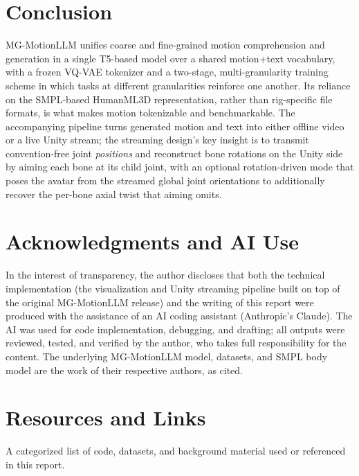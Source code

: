 \documentclass[10pt,twocolumn]{article}
\begin{document}
\section{Conclusion}
MG-MotionLLM unifies coarse and fine-grained motion comprehension and generation in a single
T5-based model over a shared motion+text vocabulary, with a frozen VQ-VAE tokenizer and a
two-stage, multi-granularity training scheme in which tasks at different granularities reinforce
one another. Its reliance on the SMPL-based HumanML3D representation, rather than rig-specific
file formats, is what makes motion tokenizable and benchmarkable. The accompanying pipeline turns
generated motion and text into either offline video or a live Unity stream; the streaming design's
key insight is to transmit convention-free joint \emph{positions} and reconstruct bone rotations on
the Unity side by aiming each bone at its child joint, with an optional rotation-driven mode that
poses the avatar from the streamed global joint orientations to additionally recover the per-bone
axial twist that aiming omits.

\section*{Acknowledgments and AI Use}
In the interest of transparency, the author discloses that both the technical implementation (the
visualization and Unity streaming pipeline built on top of the original MG-MotionLLM release) and
the writing of this report were produced with the assistance of an AI coding assistant
(Anthropic's Claude). The AI was used for code implementation, debugging, and drafting; all
outputs were reviewed, tested, and verified by the author, who takes full responsibility for the
content. The underlying MG-MotionLLM model, datasets, and SMPL body model are the work of their
respective authors, as cited.

\section{Resources and Links}
\label{sec:resources}
A categorized list of code, datasets, and background material used or referenced in this report.
\newcommand{\litem}[2]{\item \href{#1}{\nolinkurl{#1}}\\ \small\textit{#2}}
\end{document}
